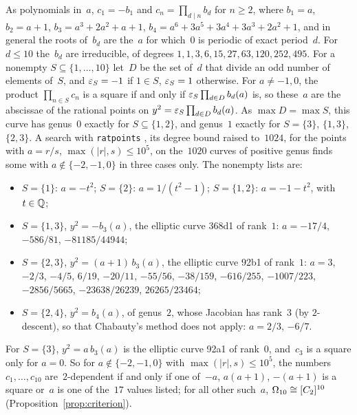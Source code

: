 \begin{remark}
  \label{rem:square-products}
  As polynomials in~$a$, $c_1 = -b_1$ and $c_n = \prod_{d \mid n} b_d$ for $n \ge 2$, where
  $b_1 = a$, $b_2 = a + 1$, $b_3 = a^3 + 2a^2 + a + 1$, $b_4 = a^6 + 3a^5 + 3a^4 + 3a^3 + 2a^2 + 1$,
  and in general the roots of~$b_d$ are the~$a$ for which~$0$ is periodic of exact period~$d$. For
  $d \le 10$ the~$b_d$ are irreducible, of degrees $1, 1, 3, 6, 15, 27, 63, 120, 252, 495$. For a
  nonempty $S \subseteq \{1, \dots, 10\}$ let~$D$ be the set of~$d$ that divide an odd number of
  elements of~$S$, and $\varepsilon_S = -1$ if $1 \in S$, $\varepsilon_S = 1$ otherwise. For $a \ne -1, 0$, the
  product $\prod_{n \in S} c_n$ is a square if and only if $\varepsilon_S \prod_{d \in D} b_d(a)$ is, so
  these~$a$ are the abscissae of the rational points on $y^2 = \varepsilon_S \prod_{d \in D} b_d(a)$. As
  $\max D = \max S$, this curve has genus~$0$ exactly for $S \subseteq \{1, 2\}$, and genus~$1$
  exactly for $S = \{3\}$, $\{1, 3\}$, $\{2, 3\}$. A search with \texttt{ratpoints}
  \cite{ratpoints}, its degree bound raised to~$1024$, for the points with $a = r/s$,
  $\max(|r|, s) \le 10^5$, on the~$1020$ curves of positive genus finds some with
  $a \notin \{-2, -1, 0\}$ in three cases only. The nonempty lists are:
  \begin{itemize}
    \item $S = \{1\}$: $a = -t^2$; $S = \{2\}$: $a = 1/(t^2 - 1)$; $S = \{1, 2\}$: $a = -1 - t^2$,
          with $t \in \mathbb{Q}$;
    \item $S = \{1, 3\}$, $y^2 = -b_3(a)$, the elliptic curve 368d1 of rank~$1$: $a = -17/4$,
          $-586/81$, $-81185/44944$;
    \item $S = \{2, 3\}$, $y^2 = (a + 1)\,b_3(a)$, the elliptic curve 92b1 of rank~$1$: $a = 3$,
          $-2/3$, $-4/5$, $6/19$, $-20/11$, $-55/56$, $-38/159$, $-616/255$, $-1007/223$,
          $-2856/5665$, $-23638/26239$, $26265/23464$;
    \item $S = \{2, 4\}$, $y^2 = b_4(a)$, of genus~$2$, whose Jacobian has rank~$3$ (by
          $2$-descent), so that Chabauty's method does not apply: $a = 2/3$, $-6/7$.
  \end{itemize}
  For $S = \{3\}$, $y^2 = a\,b_3(a)$ is the elliptic curve 92a1 of rank~$0$, and~$c_3$ is a square
  only for $a = 0$. So for $a \notin \{-2, -1, 0\}$ with $\max(|r|, s) \le 10^5$, the numbers
  $c_1, \dots, c_{10}$ are~$2$-dependent if and only if one of~$-a$, $a(a + 1)$, $-(a + 1)$ is a
  square or~$a$ is one of the~$17$ values listed; for all other such~$a$,
  $\Omega_{10} \cong [C_2]^{10}$ (Proposition~\ref{prop:criterion}).
\end{remark}

